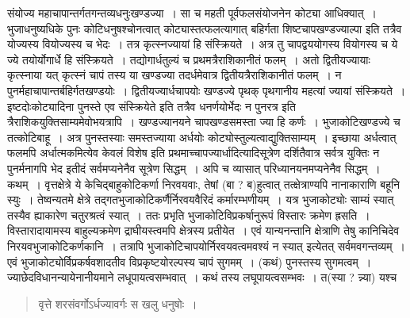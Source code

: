 \documentclass[11pt, openany]{book}
\begin{document}
\noindent संयोज्य महाचापान्तर्गतगन्तव्यधनुःखण्डज्या~। सा च महती पूर्वफलसंयोजनेन कोट्या आधिक्यात्~। भुजाधनुष्यधिके पुनः कोटिधनुषश्चोनत्वात् कोट्यास्तत्फलत्यागात् बहिर्गता शिष्टचापखण्डज्याल्पा इति तत्रैव योज्यस्य वियोज्यस्य च भेदः~। तत्र कृत्स्नज्यायां हि संस्क्रियते~। अत्र तु चापद्वययोगस्य वियोगस्य च ये ज्ये तयोर्योगार्धे हि संस्क्रियते~। तद्योगार्धतुल्यं च प्रथमत्रैराशिकानीतं फलम्~। अतो द्वितीयज्यायाः कृत्स्नाया यत् कृत्स्नं चापं तस्य या खण्डज्या तदर्धमेवात्र द्वितीयत्रैराशिकानीतं फलम्~। न पुनर्महाचापान्तर्बहिर्गतखण्डयोः~। द्वितीयज्यार्धचापयोः खण्डज्ये पृथक् पृथगानीय महत्यां ज्यायां संस्क्रियते~। इष्टदोःकोट्यादिना पुनस्ते एव संस्क्रियेते इति तत्रैव धनर्णयोर्भेदः न पुनरत्र इति त्रैराशिकयुक्तिसाम्यमेवोभयत्रापि~। खण्डज्यानयने चापखण्डसमस्ता ज्या हि कर्णः~। भुजाकोटिखण्डज्ये च तत्कोटिबाहू~। अत्र पुनस्तस्याः समस्तज्याया अर्धयोः कोट्योस्तुल्यत्वाद्युक्तिसाम्यम्~। इच्छाया अर्धत्वात् फलमपि अर्धात्मकमित्येव केवलं विशेष इति प्रथमाच्चापज्यार्धादित्यादिसूत्रेण दर्शितैवात्र सर्वत्र युक्तिः न पुनर्मनागपि भेद इतीदं सर्वमप्यनेनैव सूत्रेण सिद्धम्~। अपि च व्यासात् परिध्यानयनमप्यनेनैव सिद्धम्~। कथम्~। वृत्तक्षेत्रे ये  केचिद्बाहुकोटिकर्णा निरवयवाः, तेषां (बा ? ब)हुत्वात् तत्क्षेत्राण्यपि नानाकाराणि बहूनि स्युः~। तेष्वन्यतमे क्षेत्रे तद्गतभुजाकोटिकर्णैर्निरवयवैरिदं कर्मारम्भणीयम्~। यत्र भुजाकोट्योः साम्यं स्यात् तस्यैव ह्याकारेण चतुरश्रत्वं स्यात्~। ततः प्रभृति भुजाकोटिविप्रकर्षानुरूपं विस्तारः क्रमेण ह्रसति~। विस्तारादायामस्य बाहुल्यक्रमेण द्राघीयस्त्वमपि क्षेत्रस्य प्रतीयेत~। एवं यान्यनन्तानि क्षेत्राणि तेषु कानिचिदेव निरयवभुजाकोटिकर्णकानि~। तत्रापि भुजाकोटिचापयोर्निरवयवत्वमवश्यं न स्यात् इत्येतत् सर्वमवगन्तव्यम्~। एवं भुजाकोट्योर्विप्रकर्षवशादतीव विप्रकृष्टयोरल्पस्य चापं सुगमम्~। (कथं) पुनस्तस्य सुगमत्वम्~। ज्याछेदविधानन्यायेनानीयमाने लधूपायत्वसम्भवात्~। कथं तस्य लघूपायत्वसम्भवः~। त(स्या ? न्न्या) यश्च

\begin{quote}
{\qt वृत्ते शरसंवर्गोऽर्धज्यावर्गः स खलु धनुषोः~।}
\end{quote}

\newpage
\end{document}
